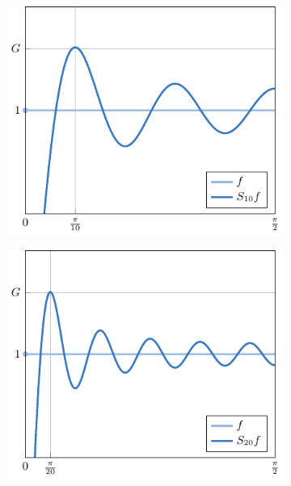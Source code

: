 \documentclass[a4paper, 12pt]{book}
\begin{document}
\begin{figure}[H]
\centering
\begin{subfigure}[b]{0.49\textwidth}
    \centering
    \includegraphics{./plot5/main.pdf}
\end{subfigure}
\begin{subfigure}[b]{0.49\textwidth}
    \centering
    \includegraphics{./plot6/main.pdf}
\end{subfigure}
\par\bigskip
\begin{subfigure}[b]{0.49\textwidth}
    \centering

\end{subfigure}
\end{figure}
\end{document}

